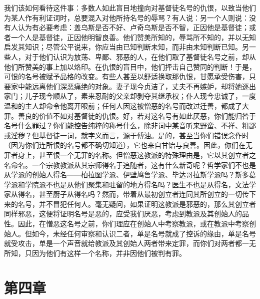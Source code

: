 我们该如何看待这件事：多数人如此盲目地撞向对基督徒名号的仇恨，以致当他们为某人作有利证词时，总要混入对他所持名号的辱骂？有人说：另一个人则说：没有人认为有必要考虑：盖乌斯是否不好、卢奇乌斯是否不智，正因他是基督徒；或者一个人是基督徒，正因他明智良善。他们赞美所知的，辱骂所不知的，并以无知启发其知识；尽管公平说来，你应当由已知判断未知，而非由未知判断已知。另一些人，对于他们认识为放荡、卑鄙、邪恶的人，在他们取了基督徒名号之前，却从他们所赞美的事上加以烙印。在仇恨的盲目中，他们抨击自己赞同的判断！于是，可恨的名号被赋予品格的改变。有些人甚至以舒适换取那仇恨，甘愿承受伤害，只要家中能远离他们深恶痛绝的对象。妻子现今贞洁了，丈夫不再嫉妒，却将她逐出家门；儿子现今顺从了，素来忍耐的父亲却剥夺其继承权；仆人现今忠诚了，一度温和的主人却命令他离开眼前；任何人因这被憎恶的名号而改过迁善，都成了大罪。善良的价值不如对基督徒的仇恨。好，若对这名号有如此厌恶，你们能归咎于名号什么罪过？你们能控告纯粹的称号什么，除非词中某音听来野蛮、不祥、粗鄙或淫秽？但基督徒一词，就字义而言，源于傅油。是的，甚至当你们错误念作时（因为你们连所恨的名号都不确切知道），它也来自甘饴与良善。因此，你们在无罪者身上，甚至恨一个无罪的名称。但憎恶这教派的特殊理由是，它以其创立者之名命名。一个宗教教派从其宗师得名于追随者，这有什么新奇呢？哲学家们不也是从学派的创始人得名——柏拉图学派、伊壁鸠鲁学派、毕达哥拉斯学派吗？斯多葛学派和学院派不也是从他们聚集和驻留的地方得名吗？医生不也是从得名，文法学家从得名，甚至厨子从得名吗？然而，带着从最初创立者连同其所创立的一切传下来的名号，并不冒犯任何人。毫无疑问，如果证明这教派是邪恶的，那么其创立者同样邪恶，这便将证明名号是恶的，应受我们厌恶，考虑到教派及其创始人的品性。因此，在憎恶这名号之前，你们理应在创始人中考察教派，或在教派中考察创始人。但如今，未经任何审察和认识二者，单是名号就成了控诉的缘由，单是名号就受攻击，单是一个声音就给教派及其创始人两者带来定罪，而你们对两者都一无所知，只因为他们有这样一个名称，并非因他们被判有罪。\par


\section{第四章}

